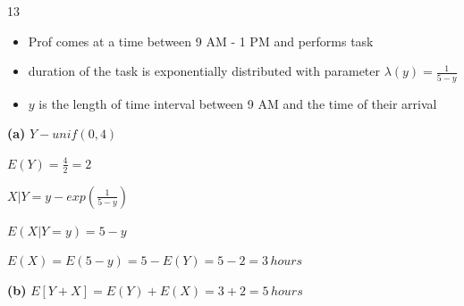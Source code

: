 \documentclass[12 pt]{article}
\begin{document}
    \begin{exercise}{13}
    \hfill

    \begin{itemize}
        \item Prof comes at a time between 9 AM - 1 PM and performs task
        \item duration of the task is exponentially distributed with parameter $\lambda(y) = \frac{1}{5-y}$
        \item $y$ is the length of time interval between 9 AM and the time of their  arrival
    \end{itemize}

    \hfill

    \textbf{(a)} $Y - unif(0,4)$

    $E(Y) = \frac{4}{2} = 2$

    \hfill

    $X|Y=y - exp(\frac{1}{5-y})$

    $E(X|Y=y) = 5-y$

    $E(X) = E(5-y) = 5 - E(Y) = 5 - 2 = 3 \, hours$

    \hfill

    \textbf{(b)}
    $E[Y+X] = E(Y) + E(X) = 3 + 2 = 5 \, hours$

    \hfill
    \end{exercise}
\end{document}
